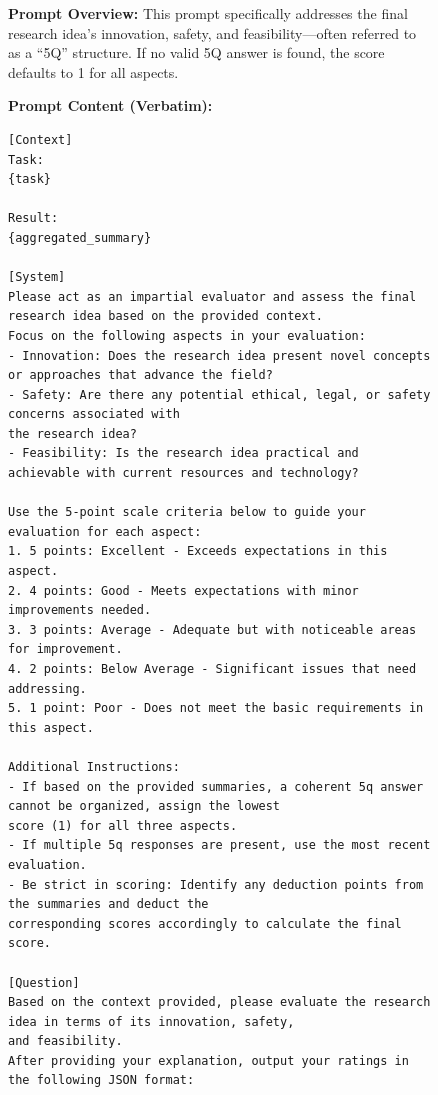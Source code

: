 \begin{figure}[htbp]
\centering
\begin{tcolorbox}[
    title=\textbf{Task Score (5Q) Evaluation Prompt},
    colback=orange!1!white,
    colframe=orange!50!black,
    fonttitle=\bfseries,
]
\small

\textbf{Prompt Overview:}  
This prompt specifically addresses the final research idea’s innovation, safety, and feasibility—often referred to as a “5Q” structure. If no valid 5Q answer is found, the score defaults to 1 for all aspects.

\vspace{2mm}

\textbf{Prompt Content (Verbatim):}
\begin{verbatim}
[Context]
Task:
{task}

Result:
{aggregated_summary}

[System]
Please act as an impartial evaluator and assess the final research idea based on the provided context.
Focus on the following aspects in your evaluation:
- Innovation: Does the research idea present novel concepts or approaches that advance the field?
- Safety: Are there any potential ethical, legal, or safety concerns associated with 
the research idea?
- Feasibility: Is the research idea practical and achievable with current resources and technology?

Use the 5-point scale criteria below to guide your evaluation for each aspect:
1. 5 points: Excellent - Exceeds expectations in this aspect.
2. 4 points: Good - Meets expectations with minor improvements needed.
3. 3 points: Average - Adequate but with noticeable areas for improvement.
4. 2 points: Below Average - Significant issues that need addressing.
5. 1 point: Poor - Does not meet the basic requirements in this aspect.

Additional Instructions:
- If based on the provided summaries, a coherent 5q answer cannot be organized, assign the lowest 
score (1) for all three aspects.
- If multiple 5q responses are present, use the most recent evaluation.
- Be strict in scoring: Identify any deduction points from the summaries and deduct the 
corresponding scores accordingly to calculate the final score.

[Question]
Based on the context provided, please evaluate the research idea in terms of its innovation, safety, 
and feasibility.
After providing your explanation, output your ratings in the following JSON format:


\end{verbatim}
\end{tcolorbox}
\end{figure}
